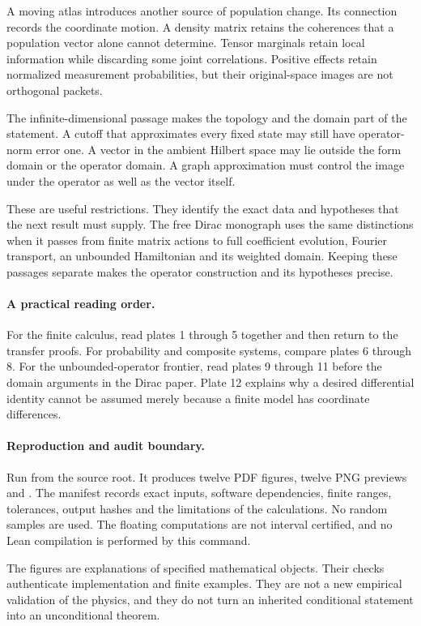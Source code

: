 A moving atlas introduces another source of population change. Its connection records the coordinate motion. A density matrix retains the coherences that a population vector alone cannot determine. Tensor marginals retain local information while discarding some joint correlations. Positive effects retain normalized measurement probabilities, but their original-space images are not orthogonal packets.

The infinite-dimensional passage makes the topology and the domain part of the statement. A cutoff that approximates every fixed state may still have operator-norm error one. A vector in the ambient Hilbert space may lie outside the form domain or the operator domain. A graph approximation must control the image under the operator as well as the vector itself.

These are useful restrictions. They identify the exact data and hypotheses that the next result must supply. The free Dirac monograph uses the same distinctions when it passes from finite matrix actions to full coefficient evolution, Fourier transport, an unbounded Hamiltonian and its weighted domain. Keeping these passages separate makes the operator construction and its hypotheses precise.

\paragraph{A practical reading order.}
For the finite calculus, read plates 1 through 5 together and then return to the transfer proofs. For probability and composite systems, compare plates 6 through 8. For the unbounded-operator frontier, read plates 9 through 11 before the domain arguments in the Dirac paper. Plate 12 explains why a desired differential identity cannot be assumed merely because a finite model has coordinate differences.

\paragraph{Reproduction and audit boundary.}
Run  from the source root. It produces twelve PDF figures, twelve PNG previews and . The manifest records exact inputs, software dependencies, finite ranges, tolerances, output hashes and the limitations of the calculations. No random samples are used. The floating computations are not interval certified, and no Lean compilation is performed by this command.

The figures are explanations of specified mathematical objects. Their checks authenticate implementation and finite examples. They are not a new empirical validation of the physics, and they do not turn an inherited conditional statement into an unconditional theorem.
\endgroup
